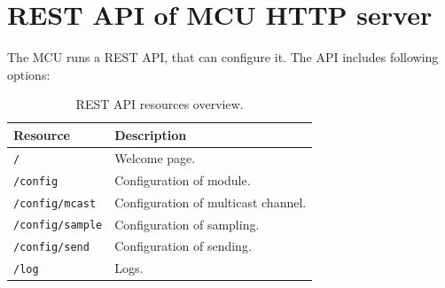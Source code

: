 





\newpage
\chapter{REST API of MCU HTTP server}
\label{appendix:mcu_restapi}

The MCU runs a REST API, that can configure it. The API includes following options:

\begin{table}[h!]
    \begin{tabular}{|l|l|} \hline
        \textbf{Resource} & \textbf{Description} \\ \hline
        \texttt{/} & Welcome page. \\ \hline
        \texttt{/config} & Configuration of module. \\ \hline
        \texttt{/config/mcast}  & Configuration of multicast channel. \\ \hline
        \texttt{/config/sample} & Configuration of sampling. \\ \hline
        \texttt{/config/send}   & Configuration of sending. \\ \hline
        \texttt{/log}         & Logs. \\ \hline
    \end{tabular}
    \caption{REST API resources overview.}
\end{table}

